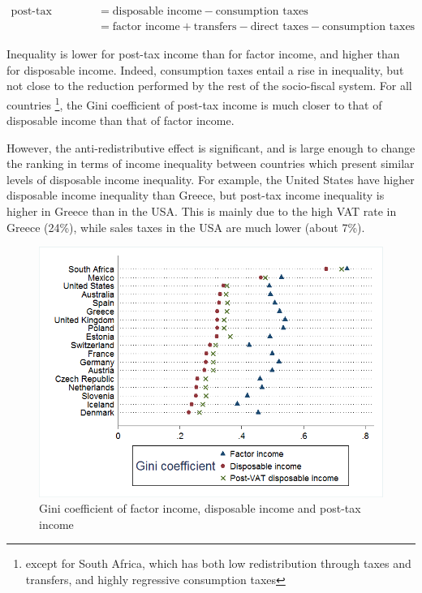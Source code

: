 \documentclass[12pt]{article}
\begin{document}
\begin{align*}
    \text{post-tax income}  &= \text{disposable income} - \text{consumption taxes} \\
                            &= \text{factor income} + \text{transfers} - \text{direct taxes} - \text{consumption taxes}
\end{align*}

Inequality is lower for post-tax income than for factor income, and higher than for disposable income. Indeed, consumption taxes entail a rise in inequality, but not close to the reduction performed by the rest of the socio-fiscal system. For all countries \footnote{except for South Africa, which has both low redistribution through taxes and transfers, and highly regressive consumption taxes}, the Gini coefficient of post-tax income is much closer to that of disposable income than that of factor income.

However, the anti-redistributive effect is significant, and is large enough to change the ranking in terms of income inequality between countries which present similar levels of disposable income inequality.  For example, the United States have higher disposable income inequality than Greece, but post-tax income inequality is higher in Greece than in the USA. This is mainly due to the high VAT rate in Greece (24\%), while sales taxes in the USA are much lower (about 7\%).

\begin{figure}
    \centering
    \includegraphics[height=0.42\textheight]{"images/19-02 factor-dispo-post"}
    \caption{Gini coefficient of factor income, disposable income and post-tax income}
    \label{fig:ginis}
\end{figure}
\end{document}
